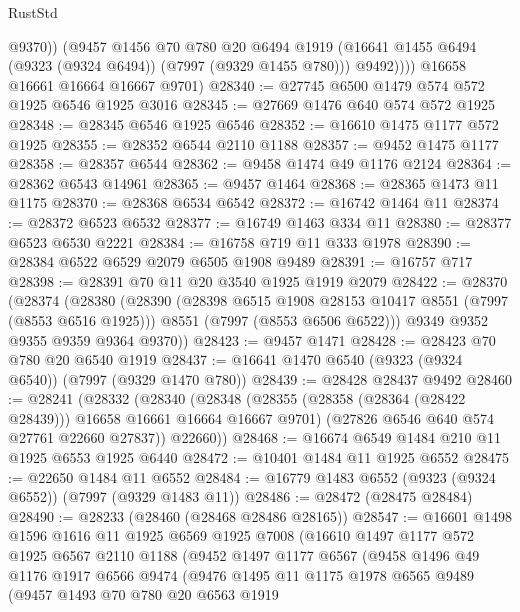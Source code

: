 \begin{lexlean}{RustStd}
\begin{coremodule}
{\begin{coremodule}
{{{{{{{{{{{{{{{{{{{{{{{{{{{{{{{{{{{{{{{{{{{                @9370))
            (@9457
              @1456
              @70
              @780
              @20
              @6494
              @1919
              (@16641 @1455 @6494 (@9323 (@9324 @6494)) (@7997 (@9329 @1455 @780)))
              @9492))))
      @16658
      @16661
      @16664
      @16667
      @9701)
@28340 := @27745 @6500 @1479 @574 @572 @1925 @6546 @1925 @3016
@28345 := @27669 @1476 @640 @574 @572 @1925
@28348 := @28345 @6546 @1925 @6546
@28352 := @16610 @1475 @1177 @572 @1925
@28355 := @28352 @6544 @2110 @1188
@28357 := @9452 @1475 @1177
@28358 := @28357 @6544
@28362 := @9458 @1474 @49 @1176 @2124
@28364 := @28362 @6543 @14961
@28365 := @9457 @1464
@28368 := @28365 @1473 @11 @1175
@28370 := @28368 @6534 @6542
@28372 := @16742 @1464 @11
@28374 := @28372 @6523 @6532
@28377 := @16749 @1463 @334 @11
@28380 := @28377 @6523 @6530 @2221
@28384 := @16758 @719 @11 @333 @1978
@28390 := @28384 @6522 @6529 @2079 @6505 @1908 @9489
@28391 := @16757 @717
@28398 := @28391 @70 @11 @20 @3540 @1925 @1919 @2079
@28422 := @28370
    (@28374
      (@28380
        (@28390
          (@28398 @6515 @1908 @28153 @10417 @8551 (@7997 (@8553 @6516 @1925)))
          @8551
          (@7997 (@8553 @6506 @6522)))
        @9349
        @9352
        @9355
        @9359
        @9364
        @9370))
@28423 := @9457 @1471
@28428 := @28423 @70 @780 @20 @6540 @1919
@28437 := @16641 @1470 @6540 (@9323 (@9324 @6540)) (@7997 (@9329 @1470 @780))
@28439 := @28428 @28437 @9492
@28460 := @28241
    (@28332
      (@28340
        (@28348
          (@28355 (@28358 (@28364 (@28422 @28439))) @16658 @16661 @16664 @16667 @9701)
          (@27826 @6546 @640 @574 @27761 @22660 @27837))
        @22660))
@28468 := @16674 @6549 @1484 @210 @11 @1925 @6553 @1925 @6440
@28472 := @10401 @1484 @11 @1925 @6552
@28475 := @22650 @1484 @11 @6552
@28484 := @16779 @1483 @6552 (@9323 (@9324 @6552)) (@7997 (@9329 @1483 @11))
@28486 := @28472 (@28475 @28484)
@28490 := @28233 (@28460 (@28468 @28486 @28165))
@28547 := @16601
    @1498
    @1596
    @1616
    @11
    @1925
    @6569
    @1925
    @7008
    (@16610
      @1497
      @1177
      @572
      @1925
      @6567
      @2110
      @1188
      (@9452
        @1497
        @1177
        @6567
        (@9458
          @1496
          @49
          @1176
          @1917
          @6566
          @9474
          (@9476
            @1495
            @11
            @1175
            @1978
            @6565
            @9489
            (@9457
              @1493
              @70
              @780
              @20
              @6563
              @1919
}}}}}}}}}}}}}}}}}}}}}}}}}}}}}}}}}}}}}}}}}}}
\end{coremodule}}
\end{coremodule}
\end{lexlean}
